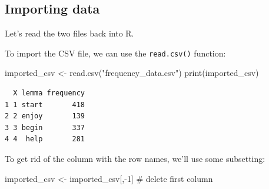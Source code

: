 \documentclass[
  11pt,
  letterpaper,
  DIV=11,
  numbers=noendperiod]{scrreprt}
\newenvironment{Shaded}{\begin{snugshade}}{\end{snugshade}}
\newcommand{\CommentTok}[1]{\textcolor[rgb]{0.37,0.37,0.37}{#1}}
\newcommand{\DecValTok}[1]{\textcolor[rgb]{0.68,0.00,0.00}{#1}}
\newcommand{\FunctionTok}[1]{\textcolor[rgb]{0.28,0.35,0.67}{#1}}
\newcommand{\NormalTok}[1]{\textcolor[rgb]{0.00,0.23,0.31}{#1}}
\newcommand{\OtherTok}[1]{\textcolor[rgb]{0.00,0.23,0.31}{#1}}
\newcommand{\SpecialCharTok}[1]{\textcolor[rgb]{0.37,0.37,0.37}{#1}}
\newcommand{\StringTok}[1]{\textcolor[rgb]{0.13,0.47,0.30}{#1}}
\begin{document}
\subsection{Importing data}\label{importing-data}

Let's read the two files back into R.

\begin{tcolorbox}[enhanced jigsaw, toprule=.15mm, opacitybacktitle=0.6, coltitle=black, arc=.35mm, colback=white, title=\textcolor{quarto-callout-note-color}{\faInfo}\hspace{0.5em}{Import from CSV}, titlerule=0mm, toptitle=1mm, bottomtitle=1mm, breakable, rightrule=.15mm, opacityback=0, bottomrule=.15mm, leftrule=.75mm, colframe=quarto-callout-note-color-frame, left=2mm, colbacktitle=quarto-callout-note-color!10!white]

To import the CSV file, we can use the \texttt{read.csv()} function:

\begin{Shaded}
\begin{Highlighting}[]
\NormalTok{imported\_csv }\OtherTok{\textless{}{-}} \FunctionTok{read.csv}\NormalTok{(}\StringTok{"frequency\_data.csv"}\NormalTok{)}
\FunctionTok{print}\NormalTok{(imported\_csv)}
\end{Highlighting}
\end{Shaded}

\begin{verbatim}
  X lemma frequency
1 1 start       418
2 2 enjoy       139
3 3 begin       337
4 4  help       281
\end{verbatim}

To get rid of the column with the row names, we'll use some subsetting:

\begin{Shaded}
\begin{Highlighting}[]
\NormalTok{imported\_csv }\OtherTok{\textless{}{-}}\NormalTok{ imported\_csv[,}\SpecialCharTok{{-}}\DecValTok{1}\NormalTok{] }\CommentTok{\# delete first column}
\end{Highlighting}
\end{Shaded}

\end{tcolorbox}
\end{document}
